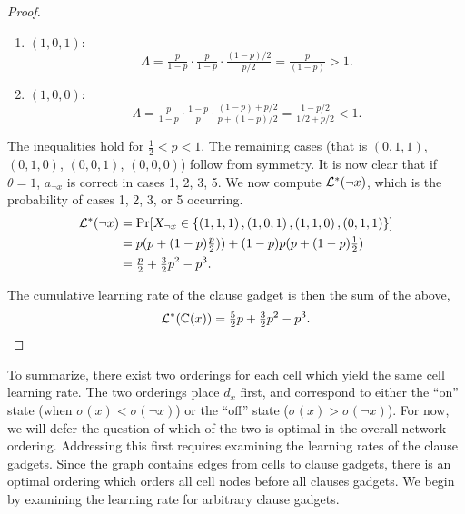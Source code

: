 \begin{proof}
\begin{enumerate}
        \item $ \left( 1,0,1 \right) $: \[
                \Lambda = \tfrac p{1-p} \cdot \tfrac p{1-p} \cdot \tfrac{(1-p) /2}{p/2} = \tfrac {p}{(1-p)} > 1.
        \]

        \item $ \left( 1,0,0 \right) $: \[
                \Lambda = \tfrac p{1-p} \cdot \tfrac {1-p}p \cdot \tfrac{(1-p) + p/2}{p + (1-p) /2} =  \tfrac {1-p/2}{1/2+ p/2} < 1.
        \]
    \end{enumerate}
    The inequalities hold for $ \tfrac 12 < p < 1 $.
    The remaining cases (that is $(0,1,1)$, $(0,1,0)$, $(0,0,1)$, $(0,0,0)$) follow from symmetry.
    It is now clear that if $ \theta = 1 $, $ a_{\lnot x} $ is correct in cases 1, 2, 3, 5.
    We now compute $ \mathcal{L}^*(\lnot x) $, which is the probability of cases 1, 2, 3, or 5 occurring. \begin{align*}
        \mathcal{L}^*(\lnot x) &= \Pr\!\left[ X_{\lnot x} \in \left\{ \left( 1,1,1 \right) ,  \left( 1,0,1 \right) ,  \left( 1,1,0 \right) ,  \left( 0,1,1 \right) \right\} \right] \\
                       &= p ( p + (1-p)\tfrac p2)) + (1-p)p(p + (1-p)\tfrac 12) \\
                       &= \tfrac p2 + \tfrac 32 p^2 - p^3.
    \end{align*}

    The cumulative learning rate of the clause gadget is then the sum of the above, \[
        \mathcal{L}^*(\mathbb{C}\!\left(x\right)) = \tfrac 52 p + \tfrac 32 p^2 - p^3.
    \]
\end{proof}

To summarize, there exist two orderings for each cell which yield the same cell learning rate.
The two orderings place $d_x$ first, and correspond to either the ``on'' state (when $ \sigma(x) < \sigma(\lnot x) $) or the ``off'' state ($ \sigma(x) > \sigma(\lnot x) $).
For now, we will defer the question of which of the two is optimal in the overall network ordering.
Addressing this first requires examining the learning rates of the clause gadgets.
Since the graph contains edges from cells to clause gadgets, there is an optimal ordering which orders all cell nodes before all clauses gadgets.
We begin by examining the learning rate for arbitrary clause gadgets. 

